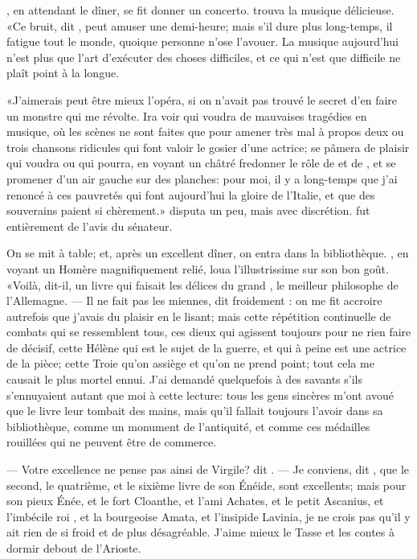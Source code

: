 , en attendant le dîner, se fit donner un concerto. 
trouva la musique délicieuse. «Ce bruit, dit , peut amuser
une demi-heure; mais s’il dure plus long-temps, il fatigue tout le
monde, quoique personne n’ose l’avouer. La musique aujourd’hui n’est
plus que l’art d’exécuter des choses difficiles, et ce qui n’est que
difficile ne plaît point à la longue.

«J’aimerais peut être mieux l’opéra, si on n’avait pas trouvé le secret
d’en faire un monstre qui me révolte. Ira voir qui voudra de mauvaises
tragédies en musique, où les scènes ne sont faites que pour amener très
mal à propos deux ou trois chansons ridicules qui font valoir le gosier
d’une actrice; se pâmera de plaisir qui voudra ou qui pourra, en voyant
un châtré fredonner le rôle de  et de , et se promener d’un
air gauche sur des planches: pour moi, il y a long-temps que j’ai
renoncé à ces pauvretés qui font aujourd’hui la gloire de l’Italie, et
que des souverains paient si chèrement.»  disputa un peu, mais
avec discrétion.  fut entièrement de l’avis du sénateur.


On se mit à table; et, après un excellent dîner, on entra dans la
bibliothèque. , en voyant un Homère magnifiquement relié, loua
l’illustrissime sur son bon goût. «Voilà, dit-il, un livre qui faisait
les délices du grand , le meilleur philosophe de l’Allemagne.
— Il ne fait pas les miennes, dit froidement : on me fit
accroire autrefois que j’avais du plaisir en le lisant; mais cette
répétition continuelle de combats qui se ressemblent tous, ces dieux
qui agissent toujours pour ne rien faire de décisif, cette Hélène qui
est le sujet de la guerre, et qui à peine est une actrice de la pièce;
cette Troie qu’on assiège et qu’on ne prend point; tout cela me causait
le plus mortel ennui. J’ai demandé quelquefois à des savants s’ils
s’ennuyaient autant que moi à cette lecture: tous les gens sincères
m’ont avoué que le livre leur tombait des mains, mais qu’il fallait
toujours l’avoir dans sa bibliothèque, comme un monument de
l’antiquité, et comme ces médailles rouillées qui ne peuvent être de
commerce.

— Votre excellence ne pense pas ainsi de Virgile? dit . — Je
conviens, dit , que le second, le quatrième, et le sixième
livre de son Énéide, sont excellents; mais pour son pieux Énée, et le
fort Cloanthe, et l’ami Achates, et le petit Ascanius, et l’imbécile
roi , et la bourgeoise Amata, et l’insipide Lavinia, je ne crois
pas qu’il y ait rien de si froid et de plus désagréable. J’aime mieux
le Tasse et les contes à dormir debout de l’Arioste.


